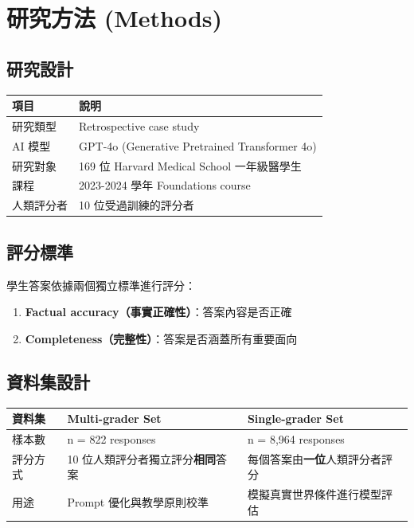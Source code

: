 \documentclass[12pt,a4paper]{article}
\begin{document}
\section{研究方法 (Methods)}

\subsection{研究設計}

\begin{longtable}{p{4cm}p{10cm}}
\toprule
\textbf{項目} & \textbf{說明} \\
\midrule
\endfirsthead
研究類型 & Retrospective case study \\
\midrule
AI 模型 & GPT-4o (Generative Pretrained Transformer 4o) \\
\midrule
研究對象 & 169 位 Harvard Medical School 一年級醫學生 \\
\midrule
課程 & 2023-2024 學年 Foundations course \\
\midrule
人類評分者 & 10 位受過訓練的評分者 \\
\bottomrule
\end{longtable}

\subsection{評分標準}

學生答案依據兩個獨立標準進行評分：

\begin{enumerate}[leftmargin=2em]
    \item \textbf{Factual accuracy（事實正確性）}：答案內容是否正確
    \item \textbf{Completeness（完整性）}：答案是否涵蓋所有重要面向
\end{enumerate}

\subsection{資料集設計}

\begin{longtable}{p{4cm}p{5cm}p{5cm}}
\toprule
\textbf{資料集} & \textbf{Multi-grader Set} & \textbf{Single-grader Set} \\
\midrule
\endfirsthead
樣本數 & n = 822 responses & n = 8,964 responses \\
\midrule
評分方式 & 10 位人類評分者獨立評分\textbf{相同}答案 & 每個答案由\textbf{一位}人類評分者評分 \\
\midrule
用途 & Prompt 優化與教學原則校準 & 模擬真實世界條件進行模型評估 \\
\bottomrule
\end{longtable}
\end{document}
